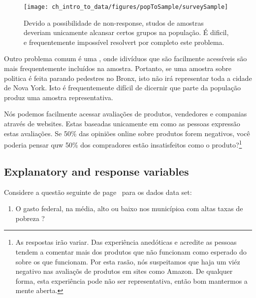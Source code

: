 \begin{figure}[h]
\centering
\texttt{[image: ch\_intro\_to\_data/figures/popToSample/surveySample]}
\caption{Devido a possibilidade de non-response, studos de amostras deveriam unicamente alcansar certos grupos na população. É dificil, e frequentemente impossível resolvert por completo este problema.}
\label{surveySample}
\end{figure}

Outro problema comum é uma , onde idivíduos que são facilmente acessíveis são mais frequentemente incluídos na amostra. Portanto, se uma amostra sobre politica é feita parando pedestres no Bronx, isto não irá representar toda a cidade de Nova York. Isto é frequentemente difícil de dicernir que parte da população produz uma amostra representativa.

\begin{exercise}
Nós podemos facilmente acessar avaliações de produtos, vendedores e companias através de websites. Estas baseadas unicamente em como as pessoas expressão estas avaliações. Se 50\% das opiniões online sobre produtos forem negativos, você poderia pensar quw 50\% dos compradores estão insatisfeitos como o produto?\footnote{As respostas irão variar. Das experiência anedóticas e acredite as pessoas tendem a comentar mais dos produtos que não funcionam como esperado do sobre os que funcionam. Por esta rasão, nós suspeitamos que haja um viéz negativo nas avaliaçõs de produtos em sites como Amazon. De qualquer forma, esta experiência pode não ser representativa, então bom mantermos a mente aberta.}
\end{exercise}


\subsection{Explanatory and response variables}
\label{explanatoryAndResponse}


Considere a questão seguinte de page~\pageref{fedSpendingPovertyQuestion}  para os dados data set:

\begin{enumerate}
\item[(1)]
    O gasto federal, na média, alto ou baixo nos municípioa com altas taxas de pobreza ?
\end{enumerate}

